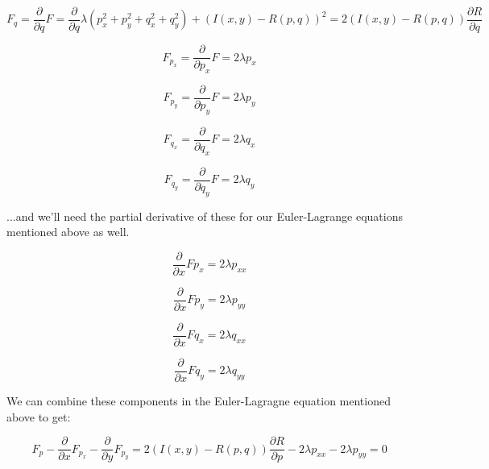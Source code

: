 \documentclass{article}
\begin{document}
\begin{equation}
    F_{q} = \frac{\partial}{\partial q} F = \frac{\partial}{\partial q} \lambda(p_x^2 + p_y^2 + q_x^2 + q_y^2) + (I(x,y) - R(p,q))^2 = 2(I(x,y)-R(p,q))\frac{\partial R}{\partial q}
\end{equation}

\begin{equation}
    F_{p_x} = \frac{\partial}{\partial p_x} F = 2\lambda p_x
\end{equation}

\begin{equation}
    F_{p_y} = \frac{\partial}{\partial p_y} F = 2\lambda p_y
\end{equation}

\begin{equation}
    F_{q_x} = \frac{\partial}{\partial q_x} F = 2\lambda q_x
\end{equation}

\begin{equation}
    F_{q_y} = \frac{\partial}{\partial q_y} F = 2\lambda q_y
\end{equation}

\noindent ...and we'll need the partial derivative of these for our Euler-Lagrange equations mentioned above as well.

\begin{equation}
    \frac{\partial}{\partial x} F{p_x} = 2 \lambda p_{xx}
\end{equation}

\begin{equation}
    \frac{\partial}{\partial x} F{p_y} = 2 \lambda p_{yy}
\end{equation}

\begin{equation}
    \frac{\partial}{\partial x} F{q_x} = 2 \lambda q_{xx}
\end{equation}

\begin{equation}
    \frac{\partial}{\partial x} F{q_y} = 2 \lambda q_{yy}
\end{equation}

\noindent We can combine these components in the Euler-Lagragne equation mentioned above to get:

\begin{equation}
    F_p - \frac{\partial}{\partial x} F_{p_x} - \frac{\partial}{\partial y} F_{p_y} = 
    2(I(x,y)-R(p,q))\frac{\partial R}{\partial p} - 2 \lambda p_{xx} - 2\lambda p_{yy} = 0
\end{equation}
\end{document}
